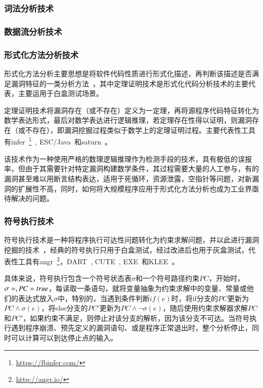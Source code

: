 \subsubsection{词法分析技术}

\subsubsection{数据流分析技术}

\subsubsection{形式化方法分析技术}
形式化方法分析主要思想是将软件代码性质进行形式化描述，再判断该描述是否满足漏洞特征的一类分析方法~\cite{B:automatedTheoremProving}，其中定理证明技术是形式化代码分析技术的主要代表，主要运用于白盒测试场景。

定理证明技术将漏洞存在（或不存在）定义为一定理，再将源程序代码特征转化为数学表达形式，最后对数学表达进行逻辑推理，若定理存在性得以证明，则漏洞存在（或不存在），即漏洞挖掘过程类似于数学上的定理证明过程。主要代表性工具有infer~\footnote{\url{https://fbinfer.com/}}~\cite{atp:infer}, ESC/Java~\cite{atp:escjava}和saturn~\cite{atp:saturn}。

该技术作为一种使用严格的数理逻辑推理作为检测手段的技术，具有极低的误报率，但由于其需要针对特定漏洞构建数学条件，其过程需要大量的人工参与，有的漏洞甚至难以用断言结构表达，适用于死循环，资源泄露，空指针等问题，对新漏洞的扩展性不高，同时，如何将大规模程序应用于形式化方法分析也成为工业界亟待解决的问题。 \\

\subsubsection{符号执行技术}
符号执行技术是一种将程序执行可达性问题转化为约束求解问题，并以此进行漏洞挖掘的技术~\cite{sym:sum}，经典的符号执行只用于白盒测试，经过改进后也用于灰盒测试，代表性工具有angr~\footnote{\url{http://angr.io/}}，DART~\cite{sym:dart}, CUTE~\cite{sym:cute}, EXE~\cite{sym:exe}和KLEE~\cite{sym:klee}。

具体来说，符号执行包含一个符号状态表$\sigma$和一个符号路径约束$PC$，开始时，$\sigma=\empty, PC=true$，每读取一条语句，就将变量抽象为约束求解中的变量、常量或他们的表达式放入$\sigma$中，特别的，当遇到条件判断$if(e)$时，将if分支的$PC$更新为$PC \wedge \sigma(e)$，将else分支的$PC'$更新为$PC\wedge \neg\sigma(e)$，随后使用约束求解器求解$PC$和$PC'$，如果约束不满足，则停止对该分支的解析，因为该分支不可达。当符号执行遇到程序崩溃、预先定义的漏洞语句、或是程序正常退出时，整个分析停止，同时可以计算可以到达停止点的输入。


